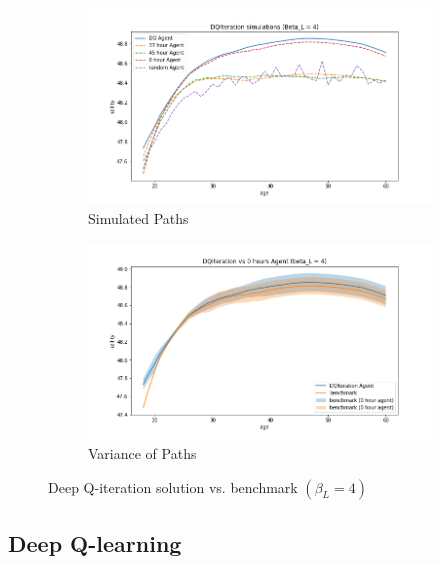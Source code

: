 \begin{figure}[ht]
\begin{subfigure}{.5\textwidth}
  \centering
  \includegraphics[width=1\linewidth]{figures/dqi_model1_beta_4_solution_benchmark_paths.png}
  \caption{Simulated Paths}
  \label{fig:dqi_solution_beta4_path}
\end{subfigure}%
\begin{subfigure}{.5\textwidth}
  \centering
  \includegraphics[width=1\linewidth]{figures/dqi_model1_beta_4_solution_benchmark_variance.png}
  \caption{Variance of Paths}
  \label{fig:dqi_solution_beta4_var}
\end{subfigure}
    \caption{Deep Q-iteration solution vs. benchmark $(\beta_L = 4)$}
    \label{fig:dqi_solution_beta4}
\end{figure}

\newpage

\subsection{Deep Q-learning}

